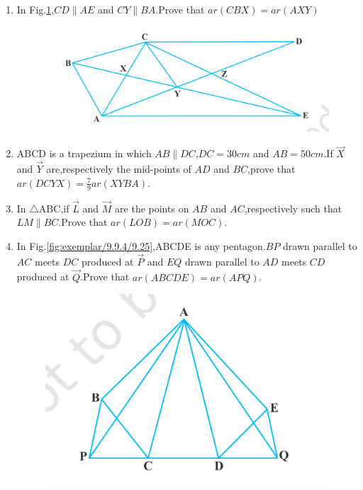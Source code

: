 \begin{enumerate}[label=\arabic*.,ref=\thesubsection.\theenumi]
\item In Fig.\ref{fig:exemplar/9.9.4/9.24},$CD \parallel AE$  and $CY \parallel BA$.Prove that  $ar (CBX) =  ar (AXY)$
\begin{figure}[h]
	\centering
	\includegraphics[width=\columnwidth]{exemplar/9.9.4/figs/Fig9.24.png}
	\caption{}
	\label{fig:exemplar/9.9.4/9.24}
\end{figure}
\item ABCD is a trapezium in which $AB \parallel DC$,$DC = 30cm$  and $AB = 50cm$.If $\vec{X}$ and $\vec{Y}$ are,respectively the mid-points of $AD$ and $BC$,prove that  $ar (DCYX) = \frac{7}{9} ar (XYBA)$.
\item  In $ \triangle${ABC},if $\vec{L}$ and $\vec{M}$ are the points on $AB$ and $AC$,respectively such that $LM \parallel BC$.Prove that $ar (LOB) = ar (MOC)$.
\item In Fig.\ref{fig:exemplar/9.9.4/9.25},ABCDE is any pentagon.$BP$ drawn parallel to $AC$ meets $DC$ produced at $\vec{P}$ and $EQ$ drawn parallel to $AD$ meets $CD$ produced at $\vec{Q}$.Prove that  $ ar (ABCDE) = ar (APQ) $.
\begin{figure}[h]
	\centering
	\includegraphics[width=\columnwidth]{exemplar/9.9.4/figs/Fig9.25.png}

\end{figure}
\end{enumerate}
